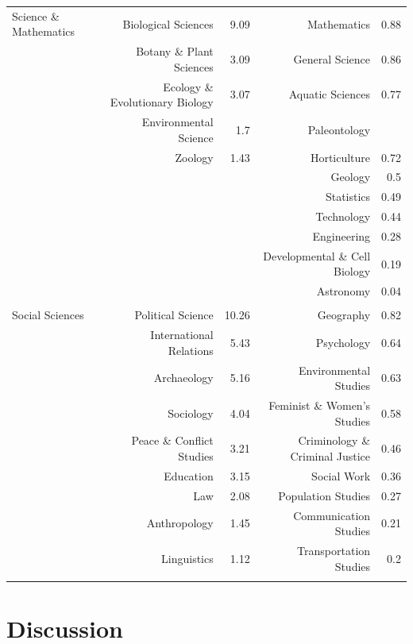 \documentclass[]{book}
\theoremstyle{definition}
\theoremstyle{definition}
\theoremstyle{definition}
\theoremstyle{remark}
\begin{document}
\begin{table}[!htbp]
\begin{tabular}{@{\extracolsep{5pt}} lrrrr}
Science \& Mathematics & Biological Sciences & 9.09 & Mathematics & 0.88 \\ 
 & Botany \& Plant Sciences & 3.09 & General Science & 0.86 \\ 
 & Ecology \& Evolutionary Biology & 3.07 & Aquatic Sciences & 0.77 \\ 
 & Environmental Science & 1.7 & Paleontology &  \\ 
 & Zoology & 1.43 & Horticulture & 0.72 \\ 
 &  &  & Geology & 0.5 \\ 
 &  &  & Statistics & 0.49 \\ 
 &  &  & Technology & 0.44 \\ 
 &  &  & Engineering & 0.28 \\ 
 &  &  & Developmental \& Cell Biology & 0.19 \\ 
 &  &  & Astronomy & 0.04 \\ 
 &  &  &  &  \\ 
Social Sciences & Political Science & 10.26 & Geography & 0.82 \\ 
 & International Relations & 5.43 & Psychology & 0.64 \\ 
 & Archaeology & 5.16 & Environmental Studies & 0.63 \\ 
 & Sociology & 4.04 & Feminist \& Women's Studies & 0.58 \\ 
 & Peace \& Conflict Studies & 3.21 & Criminology \& Criminal Justice & 0.46 \\ 
 & Education & 3.15 & Social Work & 0.36 \\ 
 & Law & 2.08 & Population Studies & 0.27 \\ 
 & Anthropology & 1.45 & Communication Studies & 0.21 \\ 
 & Linguistics & 1.12 & Transportation Studies & 0.2 \\ 
\hline \\[-1.8ex] 
\end{tabular} 
\end{table}

\hypertarget{discussion}{%
\section{Discussion}\label{discussion}}
\end{document}
